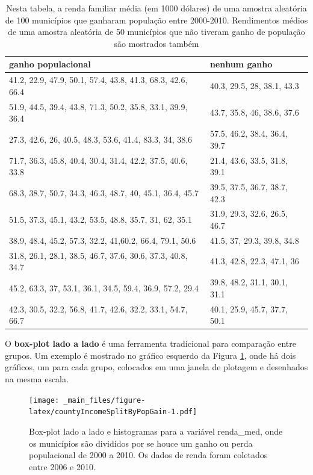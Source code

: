 \documentclass[
]{book}
\theoremstyle{definition}
\theoremstyle{definition}
\theoremstyle{definition}
\theoremstyle{definition}
\theoremstyle{remark}
\begin{document}
\begin{table}

\caption{\label{tab:countyIncomeSplitByPopGainTable}Nesta tabela, a renda familiar média (em 1000 dólares) de uma amostra aleatória de 100 municípios que ganharam população entre 2000-2010. Rendimentos médios de uma amostra aleatória de 50 municípios que não tiveram ganho de população são mostrados também}
\centering
\begin{tabular}[t]{l|l}
\hline
ganho populacional & nenhum ganho\\
\hline
41.2, 22.9, 47.9, 50.1, 57.4, 43.8, 41.3, 68.3, 42.6, 66.4 & 40.3, 29.5, 28, 38.1, 43.3\\
\hline
51.9, 44.5, 39.4, 43.8, 71.3, 50.2, 35.8, 33.1, 39.9, 36.4 & 43.7, 35.8, 46, 38.6, 37.6\\
\hline
27.3, 42.6, 26, 40.5, 48.3, 53.6, 41.4, 83.3, 34, 38.6 & 57.5, 46.2, 38.4, 36.4, 39.7\\
\hline
71.7, 36.3, 45.8, 40.4, 30.4, 31.4, 42.2, 37.5, 40.6, 33.8 & 21.4, 43.6, 33.5, 31.8, 39.1\\
\hline
68.3, 38.7, 50.7, 34.3, 46.3, 48.7, 40, 45.1, 36.4, 45.7 & 39.5, 37.5, 36.7, 38.7, 42.3\\
\hline
51.5, 37.3, 45.1, 43.2, 53.5, 48.8, 35.7, 31, 62, 35.1 & 31.9, 29.3, 32.6, 26.5, 46.7\\
\hline
38.9, 48.4, 45.2, 57.3, 32.2, 41,60.2, 66.4, 79.1, 50.6 & 41.5, 37, 29.3, 39.8, 34.8\\
\hline
31.8, 26.1, 28.1, 38.5, 46.7, 37.6, 30.6, 37.3, 40.8, 34.7 & 41.3, 42.8, 22.3, 47.1, 36\\
\hline
45.2, 63.3, 37, 53.1, 36.1, 34.5, 59.4, 36.9, 57.2, 29.4 & 39.8, 48.2, 31.1, 30.1, 31.1\\
\hline
42.3, 30.5, 32.2, 56.8, 41.7, 42.6, 32.2, 33.1, 54.7, 66.7 & 40.1, 25.9, 45.7, 37.7, 50.1\\
\hline
\end{tabular}
\end{table}

O \textbf{box-plot lado a lado} é uma ferramenta tradicional para comparação entre grupos. Um exemplo é mostrado no gráfico esquerdo da Figura \ref{fig:countyIncomeSplitByPopGain}, onde há dois gráficos, um para cada grupo, colocados em uma janela de plotagem e desenhados na mesma escala.

\begin{figure}
\centering
\texttt{[image: \_main\_files/figure-latex/countyIncomeSplitByPopGain-1.pdf]}
\caption{\label{fig:countyIncomeSplitByPopGain}Box-plot lado a lado e histogramas para a variável renda\_med, onde os municípios são divididos por se houce um ganho ou perda populacional de 2000 a 2010. Os dados de renda foram coletados entre 2006 e 2010.}
\end{figure}
\end{document}
